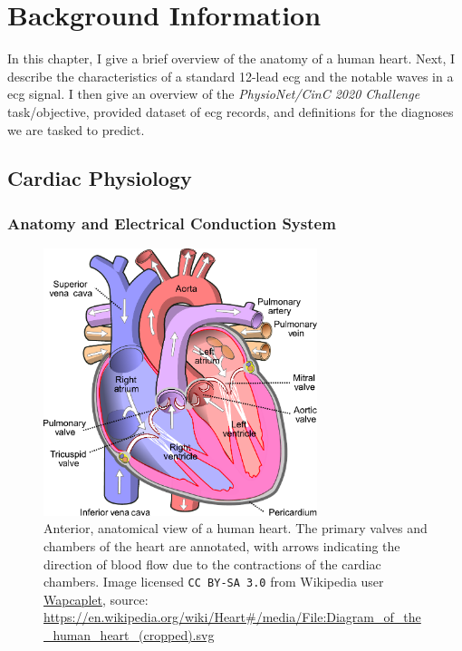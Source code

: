 \documentclass[\main/thesis.tex]{subfiles}
\begin{document}
\chapter{Background Information}
\label{chp:background}

In this chapter, I give a brief overview of the anatomy of a human heart.
Next, I describe the characteristics of a standard 12-lead \gls{ecg} and the notable waves in a \gls{ecg} signal.
I then give an overview of the \emph{PhysioNet/CinC 2020 Challenge} task/objective, provided dataset of \gls{ecg} records, and definitions for the diagnoses we are tasked to predict.

\section{Cardiac Physiology}

\subsection{Anatomy and Electrical Conduction System}
\begin{figure}[ht]
    \centering
    \includegraphics[width=8cm]{figure/Diagram_of_the_human_heart.pdf}
    \caption[Anterior, anatomical view of the structures of a human heart.]{Anterior, anatomical view of a human heart. The primary valves and chambers of the heart are annotated, with arrows indicating the direction of blood flow due to the contractions of the cardiac chambers.
    Image licensed \texttt{CC BY-SA 3.0} from Wikipedia user \href{https://en.wikipedia.org/wiki/User:Wapcaplet}{Wapcaplet}, source: \url{https://en.wikipedia.org/wiki/Heart\#/media/File:Diagram\_of\_the\_human\_heart\_(cropped).svg}
    }
    \label{fig:heart_anatomy}
\end{figure}
\end{document}
